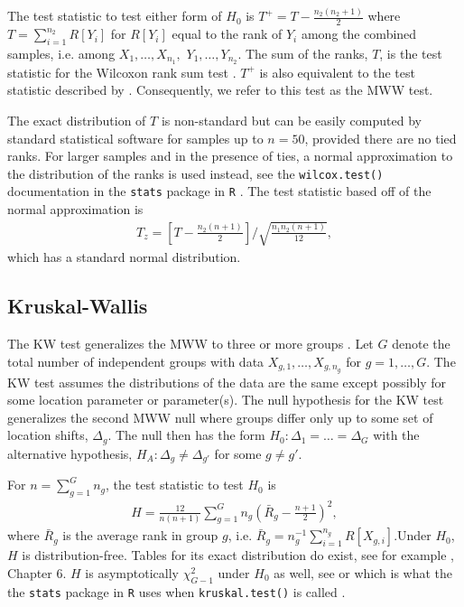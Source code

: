\documentclass[12pt]{article}
\theoremstyle{plain}
\begin{document}
%	
	The test statistic to test either form of $H_0$ is $T^+ = T - \frac{n_2(n_2 + 1)}{2}$ where $T = \sum_{i=1}^{n_2} R[Y_i]$ for $R[Y_i]$ equal to the rank of $Y_i$ among the combined samples, i.e. among $X_1, \ldots, X_{n_1},$ $Y_1, \ldots, Y_{n_2}$. The sum of the ranks, $T$, is the test statistic for the Wilcoxon rank sum test \citep{Wilcoxon1945,Kloke2015}. $T^+$ is also equivalent to the test statistic described by \cite{MannWhitney1947}. Consequently, we refer to this test as the MWW test.
	
	The exact distribution of $T$ is non-standard but can be easily computed by standard statistical software for samples up to $n = 50$, provided there are no tied ranks. For larger samples and in the presence of ties, a normal approximation to the distribution of the ranks is used instead, see the \texttt{wilcox.test()} documentation in the \texttt{stats} package in \texttt{R} \citep{Stats2022}. The test statistic based off of the normal approximation is
	\begin{align*}
		T_z = \left[T - \frac{n_2(n+1)}{2}\right]\bigg/ \sqrt{\frac{n_1 n_2 (n+1)}{12}},
	\end{align*}
	which has a standard normal distribution.

	\subsection{Kruskal-Wallis}
	
	The KW test generalizes the MWW to three or more groups \citep{KruskalWallis1952,Kloke2015}. Let $G$ denote the total number of independent groups with data $X_{g,1}, \ldots, X_{g,n_g}$ for $g = 1, \ldots, G$. The KW test assumes the distributions of the data are the same except possibly for some location parameter or parameter(s). The null hypothesis for the KW test generalizes the second MWW null where groups differ only up to some set of location shifts, $\Delta_g$. The null then has the form $H_0 : \Delta_1 = \ldots = \Delta_G$ with the alternative hypothesis, $H_A : \Delta_g \neq \Delta_{g'}$ for some $g \neq g'$. 
	
	For $n = \sum_{g=1}^G n_g$, the test statistic to test $H_0$ is
	\begin{align*}
		H = \frac{12}{n(n+1)} \sum_{g = 1}^G n_{g} \left( \bar{R}_g - \frac{n+1}{2} \right)^2,
	\end{align*}
	where $\bar{R}_g$ is the average rank in group $g$, i.e. $\bar{R}_g = n_g^{-1} \sum_{i=1}^{n_g} R[X_{g,i}]$.Under $H_0$, $H$ is distribution-free. Tables for its exact distribution do exist, see for example \cite{Hollander1999}, Chapter 6. $H$ is asymptotically $\chi_{G-1}^2$ under $H_0$ as well, see \cite{KruskalWallis1952} or \cite{Kloke2015} which is what the the \texttt{stats} package in \texttt{R} uses when \texttt{kruskal.test()} is called \citep{Stats2022}.
	
\end{document}
